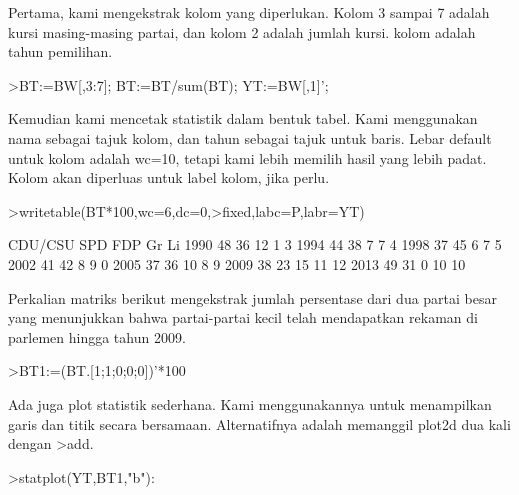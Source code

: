 \documentclass[a4paper,10pt]{article}
\begin{document}
\begin{eulernotebook}
\begin{eulercomment}
\begin{eulercomment}
\begin{eulercomment}
\begin{eulercomment}
\begin{eulercomment}
\begin{eulercomment}
\begin{eulercomment}
\begin{eulercomment}
\begin{eulercomment}
\begin{eulercomment}
\begin{eulercomment}
\begin{eulercomment}
\begin{eulercomment}
\begin{eulercomment}
\begin{eulercomment}
\begin{eulercomment}
\begin{eulercomment}
\begin{eulercomment}
\begin{eulercomment}
Pertama, kami mengekstrak kolom yang diperlukan. Kolom 3 sampai 7
adalah kursi masing-masing partai, dan kolom 2 adalah jumlah kursi.
kolom adalah tahun pemilihan.
\end{eulercomment}
\begin{eulerprompt}
>BT:=BW[,3:7]; BT:=BT/sum(BT); YT:=BW[,1]';
\end{eulerprompt}
\begin{eulercomment}
Kemudian kami mencetak statistik dalam bentuk tabel. Kami menggunakan
nama sebagai tajuk kolom, dan tahun sebagai tajuk untuk baris. Lebar
default untuk kolom adalah wc=10, tetapi kami lebih memilih hasil yang
lebih padat. Kolom akan diperluas untuk label kolom, jika perlu.
\end{eulercomment}
\begin{eulerprompt}
>writetable(BT*100,wc=6,dc=0,>fixed,labc=P,labr=YT)
\end{eulerprompt}
\begin{euleroutput}
         CDU/CSU   SPD   FDP    Gr    Li
    1990      48    36    12     1     3
    1994      44    38     7     7     4
    1998      37    45     6     7     5
    2002      41    42     8     9     0
    2005      37    36    10     8     9
    2009      38    23    15    11    12
    2013      49    31     0    10    10
\end{euleroutput}
\begin{eulercomment}
Perkalian matriks berikut mengekstrak jumlah persentase dari dua
partai besar yang menunjukkan bahwa partai-partai kecil telah
mendapatkan rekaman di parlemen hingga tahun 2009.
\end{eulercomment}
\begin{eulerprompt}
>BT1:=(BT.[1;1;0;0;0])'*100
\end{eulerprompt}
\begin{euleroutput}
  [84.29,  81.25,  81.1659,  82.7529,  72.9642,  61.8971,  79.8732]
\end{euleroutput}
\begin{eulercomment}
Ada juga plot statistik sederhana. Kami menggunakannya untuk
menampilkan garis dan titik secara bersamaan. Alternatifnya adalah
memanggil plot2d dua kali dengan \textgreater{}add.
\end{eulercomment}
\begin{eulerprompt}
>statplot(YT,BT1,"b"):
\end{eulerprompt}
\begin{eulercomment}

\end{eulercomment}
\end{eulercomment}
\end{eulercomment}
\end{eulercomment}
\end{eulercomment}
\end{eulercomment}
\end{eulercomment}
\end{eulercomment}
\end{eulercomment}
\end{eulercomment}
\end{eulercomment}
\end{eulercomment}
\end{eulercomment}
\end{eulercomment}
\end{eulercomment}
\end{eulercomment}
\end{eulercomment}
\end{eulercomment}
\end{eulercomment}
\end{eulernotebook}
\end{document}
